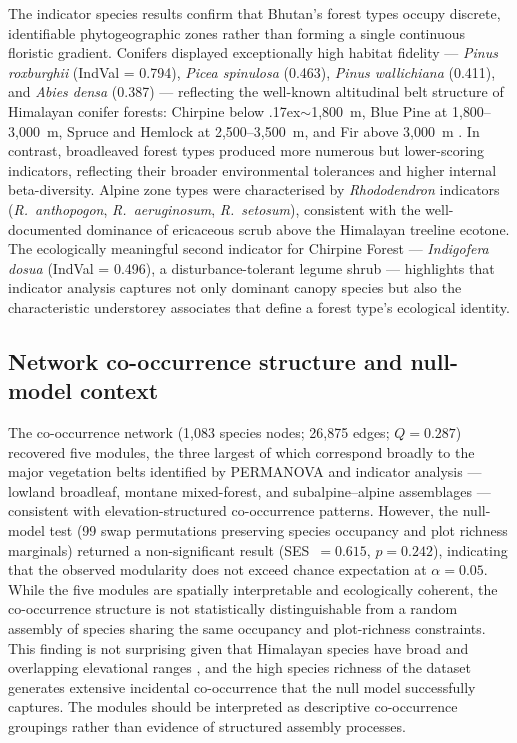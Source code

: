 \documentclass[review,12pt,a4paper]{elsarticle}
\begin{document}
The indicator species results confirm that Bhutan's forest types occupy
discrete, identifiable phytogeographic zones rather than forming a single
continuous floristic gradient. Conifers displayed exceptionally high habitat
fidelity --- \textit{Pinus roxburghii} (IndVal = 0.794),
\textit{Picea spinulosa} (0.463), \textit{Pinus wallichiana} (0.411), and
\textit{Abies densa} (0.387) --- reflecting the well-known altitudinal belt
structure of Himalayan conifer forests: Chirpine below {\raise.17ex\hbox{$\scriptstyle\sim$}}1{,}800~m, Blue Pine at
1{,}800--3{,}000~m, Spruce and Hemlock at 2{,}500--3{,}500~m, and Fir above
3{,}000~m \citep{schickhoff2005}. In contrast, broadleaved forest types
produced more numerous but lower-scoring indicators, reflecting their broader
environmental tolerances and higher internal beta-diversity. Alpine zone types
were characterised by \textit{Rhododendron} indicators (\textit{R.\ anthopogon},
\textit{R.\ aeruginosum}, \textit{R.\ setosum}), consistent with the
well-documented dominance of ericaceous scrub above the Himalayan treeline
ecotone. The ecologically meaningful second indicator for Chirpine Forest ---
\textit{Indigofera dosua} (IndVal = 0.496), a disturbance-tolerant legume
shrub --- highlights that indicator analysis captures not only dominant canopy
species but also the characteristic understorey associates that define a forest
type's ecological identity.

\subsection{Network co-occurrence structure and null-model context}
\label{sec:disc_network}

The co-occurrence network (1{,}083 species nodes; 26{,}875 edges; $Q = 0.287$)
recovered five modules, the three largest of which correspond broadly to the
major vegetation belts identified by PERMANOVA and indicator analysis ---
lowland broadleaf, montane mixed-forest, and subalpine--alpine assemblages ---
consistent with elevation-structured co-occurrence patterns. However, the
null-model test (99 swap permutations preserving species occupancy and plot
richness marginals) returned a non-significant result (SES~$= 0.615$,
$p = 0.242$), indicating that the observed modularity does not exceed chance
expectation at $\alpha = 0.05$. While the five modules are spatially
interpretable and ecologically coherent, the co-occurrence structure is not
statistically distinguishable from a random assembly of species sharing the
same occupancy and plot-richness constraints. This finding is not surprising
given that Himalayan species have broad and overlapping elevational ranges
\citep{schickhoff2005}, and the high species richness of the dataset generates
extensive incidental co-occurrence that the null model successfully captures.
The modules should be interpreted as descriptive co-occurrence groupings
rather than evidence of structured assembly processes.
\end{document}
